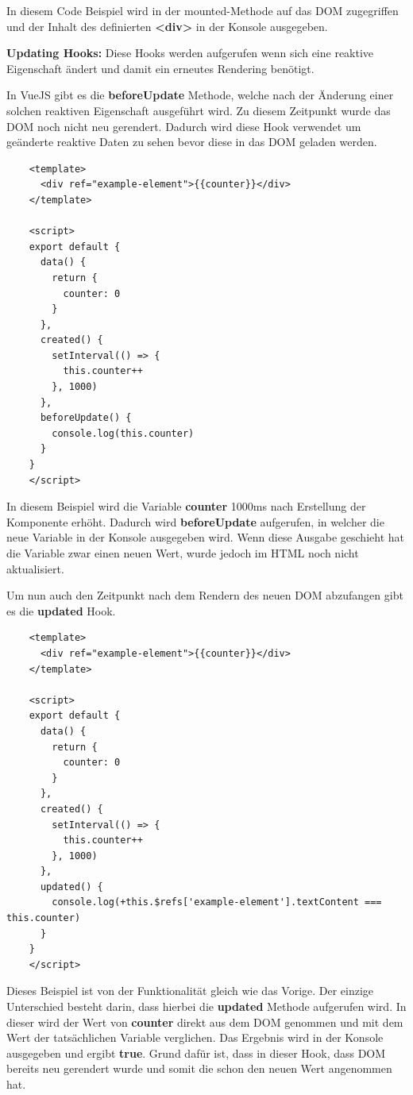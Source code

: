 In diesem Code Beispiel wird in der mounted-Methode auf das DOM zugegriffen und der Inhalt des definierten \textbf{<div>} in der Konsole ausgegeben.

\textbf{Updating Hooks:}
\newline
Diese Hooks werden aufgerufen wenn sich eine reaktive Eigenschaft ändert und damit ein erneutes Rendering benötigt.

In VueJS gibt es die \textbf{beforeUpdate} Methode, welche nach der Änderung einer solchen reaktiven Eigenschaft ausgeführt wird. Zu diesem Zeitpunkt wurde das DOM noch nicht neu gerendert. Dadurch wird diese Hook verwendet um geänderte reaktive Daten zu sehen bevor diese in das DOM geladen werden.

\begin{lstlisting}
    <template>
      <div ref="example-element">{{counter}}</div>
    </template>
    
    <script>
    export default {
      data() {
        return {
          counter: 0
        }
      },
      created() {
        setInterval(() => {
          this.counter++
        }, 1000)
      },
      beforeUpdate() {
        console.log(this.counter)
      }
    }
    </script>
\end{lstlisting}

In diesem Beispiel wird die Variable \textbf{counter} 1000ms nach Erstellung der Komponente erhöht. Dadurch wird \textbf{beforeUpdate} aufgerufen, in welcher die neue Variable in der Konsole ausgegeben wird. Wenn diese Ausgabe geschieht hat die Variable zwar einen neuen Wert, wurde jedoch im HTML noch nicht aktualisiert.

Um nun auch den Zeitpunkt nach dem Rendern des neuen DOM abzufangen gibt es die \textbf{updated} Hook.

\begin{lstlisting}
    <template>
      <div ref="example-element">{{counter}}</div>
    </template>
    
    <script>
    export default {
      data() {
        return {
          counter: 0
        }
      },
      created() {
        setInterval(() => {
          this.counter++
        }, 1000)
      },
      updated() {
        console.log(+this.$refs['example-element'].textContent === this.counter)
      }
    }
    </script>
\end{lstlisting}

Dieses Beispiel ist von der Funktionalität gleich wie das Vorige. Der einzige Unterschied besteht darin, dass hierbei die \textbf{updated} Methode aufgerufen wird. In dieser wird der Wert von \textbf{counter} direkt aus dem DOM genommen und mit dem Wert der tatsächlichen Variable verglichen. Das Ergebnis wird in der Konsole ausgegeben und ergibt \textbf{true}. Grund dafür ist, dass in dieser Hook, dass DOM bereits neu gerendert wurde und somit die schon den neuen Wert angenommen hat.

